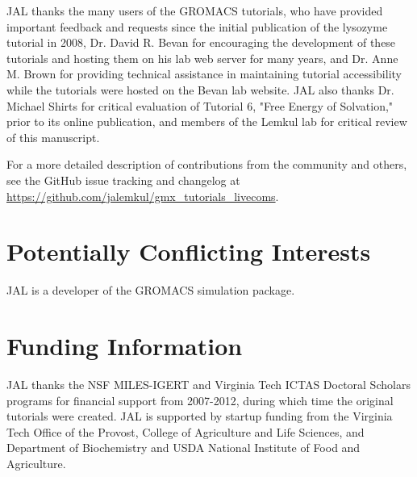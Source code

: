 \documentclass[9pt,tutorial,pubversion]{livecoms}
\newcommand{\githubrepository}{\url{https://github.com/jalemkul/gmx_tutorials_livecoms}}  %
\begin{document}
JAL thanks the many users of the GROMACS tutorials, who have provided important feedback and requests since the initial publication of the lysozyme tutorial in 2008, Dr. David R. Bevan for encouraging the development of these tutorials and hosting them on his lab web server for many years, and Dr. Anne M. Brown for providing technical assistance in maintaining tutorial accessibility while the tutorials were hosted on the Bevan lab website. JAL also thanks Dr. Michael Shirts for critical evaluation of Tutorial 6, "Free Energy of Solvation," prior to its online publication, and members of the Lemkul lab for critical review of this manuscript.

For a more detailed description of contributions from the community and others, see the GitHub issue tracking and changelog at \githubrepository.

\section{Potentially Conflicting Interests}

JAL is a developer of the GROMACS simulation package.

\section{Funding Information}
JAL thanks the NSF MILES-IGERT and Virginia Tech ICTAS Doctoral Scholars programs for financial support from 2007-2012, during which time the original tutorials were created. JAL is supported by startup funding from the Virginia Tech Office of the Provost, College of Agriculture and Life Sciences, and Department of Biochemistry and USDA National Institute of Food and Agriculture.




\end{document}

